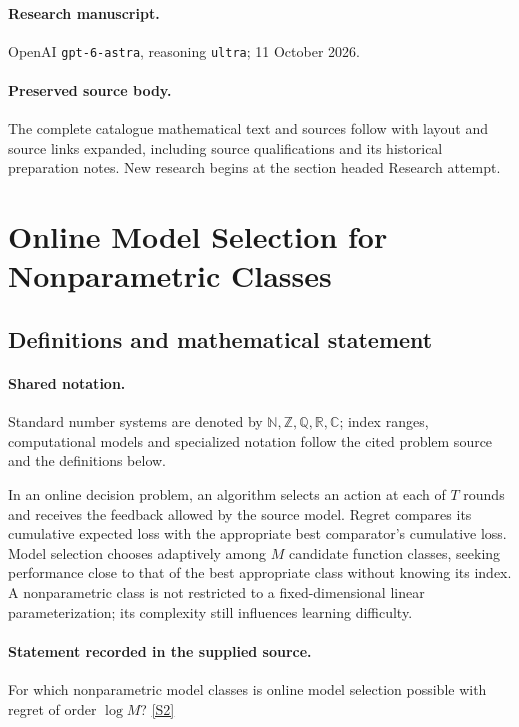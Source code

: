 \documentclass[11pt]{article}
\begin{document}
\paragraph{Research manuscript.} OpenAI \texttt{gpt-6-astra}, reasoning \texttt{ultra}; 11 October 2026.
\paragraph{Preserved source body.} The complete catalogue mathematical text and sources follow with layout and source links expanded, including source qualifications and its historical preparation notes. New research begins at the section headed Research attempt.

\section{Online Model Selection for Nonparametric Classes}\label{statement}

\subsection{Definitions and mathematical statement}

\paragraph{Shared notation.}Standard number systems are denoted by $\mathbb N,\mathbb Z,\mathbb Q,\mathbb R,\mathbb C$; index ranges, computational models and specialized notation follow the cited problem source and the definitions below.


In an online decision problem, an algorithm selects an action at each of $T$ rounds and receives the feedback allowed by the source model. Regret compares its cumulative expected loss with the appropriate best comparator's cumulative loss. Model selection chooses adaptively among $M$ candidate function classes, seeking performance close to that of the best appropriate class without knowing its index. A nonparametric class is not restricted to a fixed-dimensional linear parameterization; its complexity still influences learning difficulty.
\paragraph{Statement recorded in the supplied source.}
For which nonparametric model classes is online model selection possible with regret of order $\log M$? \href{https://doi.org/10.4171/owr/2024/24}{[S2]}
\end{document}
